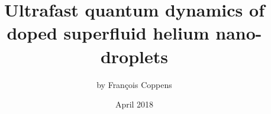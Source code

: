 \title{Ultrafast quantum dynamics of doped superfluid helium nano-droplets}
\author{by Fran\c{c}ois Coppens}
\date{April 2018}
\maketitle